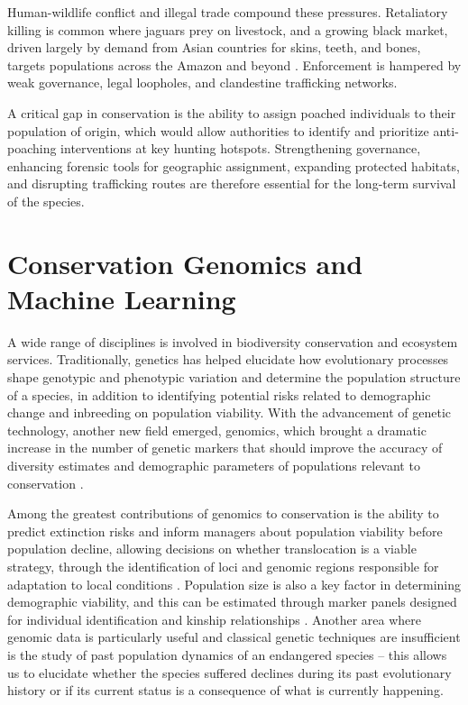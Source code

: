 Human-wildlife conflict and illegal trade compound these pressures. Retaliatory killing is common where jaguars prey on livestock, and a growing black market, driven largely by demand from Asian countries for skins, teeth, and bones, targets populations across the Amazon and beyond \cite{morcatty2020illegal}. Enforcement is hampered by weak governance, legal loopholes, and clandestine trafficking networks.

A critical gap in conservation is the ability to assign poached individuals to their population of origin, which would allow authorities to identify and prioritize anti-poaching interventions at key hunting hotspots. Strengthening governance, enhancing forensic tools for geographic assignment, expanding protected habitats, and disrupting trafficking routes are therefore essential for the long-term survival of the species.

\section{Conservation Genomics and Machine Learning}

A wide range of disciplines is involved in biodiversity conservation and ecosystem services. Traditionally, genetics has helped elucidate how evolutionary processes shape genotypic and phenotypic variation and determine the population structure of a species, in addition to identifying potential risks related to demographic change and inbreeding on population viability. With the advancement of genetic technology, another new field emerged, genomics, which brought a dramatic increase in the number of genetic markers that should improve the accuracy of diversity estimates and demographic parameters of populations relevant to conservation \cite{shafer2015genomics}.

Among the greatest contributions of genomics to conservation is the ability to predict extinction risks and inform managers about population viability before population decline, allowing decisions on whether translocation is a viable strategy, through the identification of loci and genomic regions responsible for adaptation to local conditions \cite{mcmahon2014how}. Population size is also a key factor in determining demographic viability, and this can be estimated through marker panels designed for individual identification and kinship relationships \cite{hohenlohe2021population}. Another area where genomic data is particularly useful and classical genetic techniques are insufficient is the study of past population dynamics of an endangered species – this allows us to elucidate whether the species suffered declines during its past evolutionary history or if its current status is a consequence of what is currently happening.

